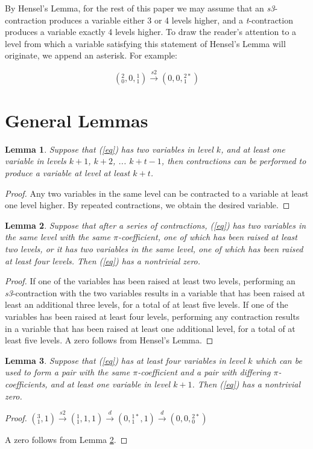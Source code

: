 \documentclass[12pt]{amsart}
\newtheorem{lemma}{Lemma}
\begin{document}
By Hensel's Lemma, for the rest of this paper we may assume that an \textit{s3}-contraction produces a variable either 3 or 4 levels higher, and a \textit{t}-contraction produces a variable exactly 4 levels higher.  To draw the reader's attention to a level from which a variable satisfying this statement of Hensel's Lemma will originate, we append an asterisk.  For example:

$$({}^{2}_{0}, 0, {}^{1}_{1}) \xrightarrow{s2} (0, 0, {}^{2*}_{1})$$

\section{General Lemmas}

\begin{lemma} \label{slide}
Suppose that (\ref{eq}) has two variables in level $k$, and at least one variable in levels $k+1$, $k+2$, ... $k+t-1$, then contractions can be performed to produce a variable at level at least $k+t$.
\end{lemma}
\begin{proof}
Any two variables in the same level can be contracted to a variable at least one level higher.  By repeated contractions, we obtain the desired variable.
\end{proof}

\begin{lemma}\label{fromtwo}
Suppose that after a series of contractions, (\ref{eq}) has two variables in the same level with the same $\pi$-coefficient, one of which has been raised at least two levels, or it has two variables in the same level, one of which has been raised at least four levels.  Then (\ref{eq}) has a nontrivial zero.
\end{lemma}
\begin{proof}
If one of the variables has been raised at least two levels, performing an \textit{s3}-contraction with the two variables results in a variable that has been raised at least an additional three levels, for a total of at least five levels.  If one of the variables has been raised at least four levels, performing any contraction results in a variable that has been raised at least one additional level, for a total of at least five levels.  A zero follows from Hensel's Lemma.
\end{proof}

\begin{lemma}\label{empty1}
Suppose that (\ref{eq}) has at least four variables in level $k$ which can be used to form a pair with the same $\pi$-coefficient and a pair with differing $\pi$-coefficients, and at least one variable in level $k+1$.  Then (\ref{eq}) has a nontrivial zero.
\end{lemma}
\begin{proof}
$({}^{3}_{1}, 1) \xrightarrow{s2} ({}^{1}_{1}, 1, 1) \xrightarrow{d} (0, {}^{1*}_{1}, 1) \xrightarrow{d} (0, 0, {}^{2*}_{0})$

A zero follows from Lemma \ref{fromtwo}.
\end{proof}
\end{document}

